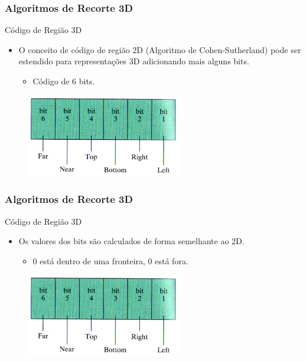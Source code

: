 \documentclass{beamer}
\begin{document}
\begin{frame}
\frametitle{Algoritmos de Recorte 3D}
	\begin{block}{Código de Região 3D}
		\begin{itemize}
			\item O conceito de código de região 2D (Algoritmo de Cohen-Sutherland) pode ser estendido  para representações 3D adicionando mais alguns bits.
			\begin{itemize}
				\item Código de 6 bits.
			\end{itemize}
		\end{itemize}	
	\end{block}
	
	\begin{figure}[!h]
			\begin{center}
			\includegraphics[width=0.6\textwidth]{Figures/CodReg}
			\end{center}
	\end{figure}
\end{frame}

\begin{frame}
\frametitle{Algoritmos de Recorte 3D}
	\begin{block}{Código de Região 3D}
		\begin{itemize}
			\item Os valores dos bits são calculados de forma semelhante ao 2D.
			\begin{itemize}
				\item 0 está dentro de uma fronteira, 0 está fora.
			\end{itemize}
		\end{itemize}	
	\end{block}
	
	\begin{figure}[!h]
			\begin{center}
			\includegraphics[width=0.6\textwidth]{Figures/CodReg}
			\end{center}
	\end{figure}
\end{frame}
\end{document}
